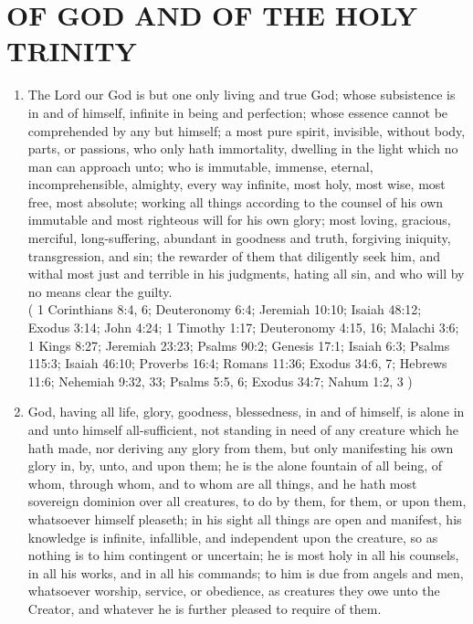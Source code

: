 \documentclass[12pt,a4paper]{book}
\begin{document}
\chapter{OF GOD AND OF THE HOLY TRINITY}
\label{ch-God}
\begin{enumerate}
\item
\label{ch-God-1}
The Lord our God is but one only living and true God; whose subsistence is in and of himself, infinite in being and perfection; whose essence cannot be comprehended by any but himself; a most pure spirit, invisible, without body, parts, or passions, who only hath immortality, dwelling in the light which no man can approach unto; who is immutable, immense, eternal, incomprehensible, almighty, every way infinite, most holy, most wise, most free, most absolute; working all things according to the counsel of his own immutable and most righteous will for his own glory; most loving, gracious, merciful, long-suffering, abundant in goodness and truth, forgiving iniquity, transgression, and sin; the rewarder of them that diligently seek him, and withal most just and terrible in his judgments, hating all sin, and who will by no means clear the guilty.\\
( 1 Corinthians 8:4, 6; Deuteronomy 6:4; Jeremiah 10:10; Isaiah 48:12; Exodus 3:14; John 4:24; 1 Timothy 1:17; Deuteronomy 4:15, 16; Malachi 3:6; 1 Kings 8:27; Jeremiah 23:23; Psalms 90:2; Genesis 17:1; Isaiah 6:3; Psalms 115:3; Isaiah 46:10; Proverbs 16:4; Romans 11:36; Exodus 34:6, 7; Hebrews 11:6; Nehemiah 9:32, 33; Psalms 5:5, 6; Exodus 34:7; Nahum 1:2, 3 )
\item
\label{ch-God-2}
God, having all life, glory, goodness, blessedness, in and of himself, is alone in and unto himself all-sufficient, not standing in need of any creature which he hath made, nor deriving any glory from them, but only manifesting his own glory in, by, unto, and upon them; he is the alone fountain of all being, of whom, through whom, and to whom are all things, and he hath most sovereign dominion over all creatures, to do by them, for them, or upon them, whatsoever himself pleaseth; in his sight all things are open and manifest, his knowledge is infinite, infallible, and independent upon the creature, so as nothing is to him contingent or uncertain; he is most holy in all his counsels, in all his works, and in all his commands; to him is due from angels and men, whatsoever worship, service, or obedience, as creatures they owe unto the Creator, and whatever he is further pleased to require of them.\\

\end{enumerate}
\end{document}
